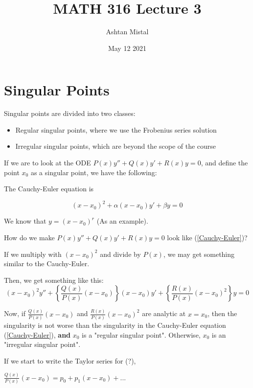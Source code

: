 \documentclass{article}
\title{MATH 316 Lecture 3}
\author{Ashtan Mistal}
\date{May 12 2021}
\begin{document}
\ifstandalone
\maketitle
\fi

\graphicspath{{./Lecture03/}}

\section{Singular Points}

Singular points are divided into two classes:

\begin{itemize}
    \item Regular singular points, where we use the Frobenius series solution
    \item Irregular singular points, which are beyond the scope of the course
\end{itemize}

If we are to look at the ODE $P(x) y'' + Q(x) y' + R(x) y = 0$, and define the point $x_0$ as a singular point, we have the following:

The Cauchy-Euler equation is 

\begin{equation}
\label{Cauchy-Euler}
    (x - x_0)^2 + \alpha (x - x_0) y' + \beta y = 0
\end{equation}

We know that $y = (x - x_0)^r$ (As an example). 

How do we make $P(x) y'' + Q(x) y' + R(x) y = 0$ look like (\ref{Cauchy-Euler})?

If we multiply with $(x - x_0)^2$ and divide by $P(x)$, we may get something similar to the Cauchy-Euler. 

Then, we get something like this:
\begin{equation}
    (x - x_0)^2 y'' + \left\{ \frac{Q(x)}{P(x)} (x - x_0) \right\} (x - x_0) y' + \left\{ \frac{R(x)}{P(x)} (x - x_0)^2 \right\} y = 0
\end{equation}


Now, if $\frac{Q(x)}{P(x)}(x - x_0)$ and $\frac{R(x)}{P(x)} (x - x_0)^2$ are analytic at $x = x_0$, then the singularity is not worse than the singularity in the Cauchy-Euler equation (\ref{Cauchy-Euler}), \textbf{and} $x_0$ is a "regular singular point". Otherwise, $x_0$ is an "irregular singular point". 

If we start to write the Taylor series for (?),

$\frac{Q(x)}{P(x)} (x - x_0) = p_0 + p_1 (x - x_0) + ...$
\end{document}
